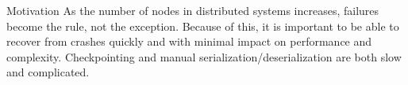 \begin{block}{Motivation}
    As the number of nodes in distributed systems increases, failures become
    the rule, not the exception. Because of this, it is important to be able to
    recover from crashes quickly and with minimal impact on performance and
    complexity. Checkpointing and manual serialization/deserialization are both
    slow and complicated.
\end{block}
